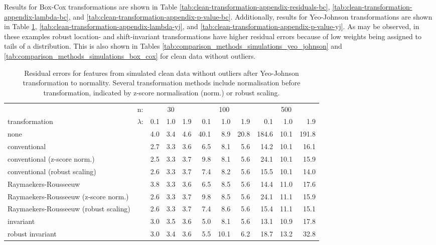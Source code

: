 \documentclass[
  a4paper,
]{article}
\begin{document}
Results for Box-Cox transformations are shown in Table
\ref{tab:clean-transformation-appendix-residuals-bc},
\ref{tab:clean-transformation-appendix-lambda-bc}, and
\ref{tab:clean-transformation-appendix-p-value-bc}. Additionally,
results for Yeo-Johnson transformations are shown in Table
\ref{tab:clean-transformation-appendix-residuals-yj},
\ref{tab:clean-transformation-appendix-lambda-yj}, and
\ref{tab:clean-transformation-appendix-p-value-yj}. As may be observed,
in these examples robust location- and shift-invariant transformations
have higher residual errors because of low weights being assigned to
tails of a distribution. This is also shown in Tables
\ref{tab:comparison_methods_simulations_yeo_johnson} and
\ref{tab:comparison_methods_simulations_box_cox} for clean data without
outliers.

\begin{table}
\begin{center}
\caption{Residual errors for features from simulated clean data without outliers after Yeo-Johnson transformation to normality.
Several transformation methods include normalisation before transformation, indicated by z-score normalisation (norm.) or robust scaling.}
\label{tab:clean-transformation-appendix-residuals-yj}
\small{
\begin{tabular}{l | l r r r r r r r r r}

\toprule
& n: & \multicolumn{3}{c}{30} & \multicolumn{3}{c}{100} & \multicolumn{3}{c}{500} \\
transformation & $\lambda$: & 0.1 & 1.0 & 1.9 & 0.1 & 1.0 & 1.9 & 0.1 & 1.0 & 1.9 \\

\midrule

none                                  & & 4.0 & 3.4 & 4.6 & 40.1 &  8.9 & 20.8 & 184.6 & 10.1 & 191.8 \\
conventional                          & & 2.7 & 3.3 & 3.6 &  6.5 &  8.1 &  5.6 &  14.2 & 10.1 &  16.1 \\
conventional (z-score norm.)          & & 2.5 & 3.3 & 3.7 &  9.8 &  8.1 &  5.6 &  24.1 & 10.1 &  15.9 \\
conventional (robust scaling)         & & 2.6 & 3.3 & 3.7 &  7.4 &  8.2 &  5.6 &  15.5 & 10.1 &  14.0 \\
Raymaekers-Rousseeuw                  & & 3.8 & 3.3 & 3.6 &  6.5 &  8.5 &  5.6 &  14.4 & 11.0 &  17.6 \\
Raymaekers-Rousseeuw (z-score norm.)  & & 2.6 & 3.3 & 3.7 &  9.8 &  8.5 &  5.6 &  24.1 & 11.1 &  15.9 \\
Raymaekers-Rousseeuw (robust scaling) & & 2.6 & 3.3 & 3.7 &  7.4 &  8.6 &  5.6 &  15.4 & 11.1 &  15.1 \\
invariant                             & & 3.0 & 3.5 & 3.6 &  5.0 &  8.1 &  5.6 &  13.1 & 10.9 &  17.8 \\
robust invariant                      & & 3.0 & 3.4 & 3.6 &  5.5 & 10.1 &  6.2 &  18.7 & 13.2 &  32.8 \\

\bottomrule
\end{tabular}
}
\end{center}
\end{table}
\end{document}
